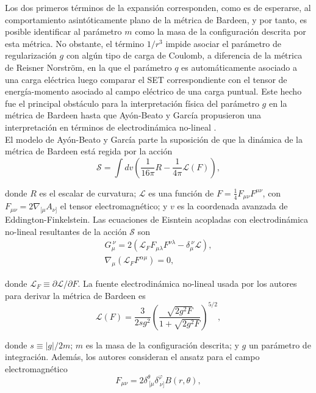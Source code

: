\documentclass[16pt,a4paper]{article}
\numberwithin{equation}{section}
\theoremstyle{definition}
\begin{document}
Los dos primeros términos de la expansión corresponden, como es de esperarse, al comportamiento asintóticamente plano de la métrica de Bardeen, y por tanto, es posible identificar al parámetro $m$ como la masa de la configuración descrita por esta métrica. No obstante, el término $1/r^3$ impide asociar el parámetro  de regularización $g$ con algún tipo de carga de Coulomb, a diferencia de la métrica de Reisner Norström, en la que el parámetro $q$ es automáticamente asociado a una carga eléctrica luego comparar el SET correspondiente con el tensor de energía-momento asociado al campo eléctrico de una carga puntual. Este hecho fue el principal obstáculo para la interpretación física del parámetro $g$ en la métrica de Bardeen hasta que Ayón-Beato y García propusieron una interpretación en términos de electrodinámica no-lineal \cite{ayon-beato2000}.\\

El modelo de Ayón-Beato y García parte la suposición de que la dinámica de la métrica de Bardeen está regida por la acción
\begin{equation}
\mathcal{S} = \int dv \left( \frac{1}{16 \pi}R - \frac{1}{4 \pi}\mathcal{L}(F) \right),
\end{equation}

donde $R$ es el escalar de curvatura; $\mathcal{L}$ es una función de $F = \frac{1}{4}F_{\mu \nu}F^{\mu \nu}$, con $F_{\mu \nu} = 2\nabla_{[\mu}A_{\nu]}$ el tensor electromagnético; y $v$ es la coordenada avanzada de Eddington-Finkelstein. Las ecuaciones de Eisntein acopladas con electrodinámica no-lineal resultantes de la acción $\mathcal{S}$ son
\begin{equation}
\label{euler lagrange eqns}
\begin{aligned}
G_{\mu}^{\ \nu} = 2(\mathcal{L}_{F} F_{\mu \lambda} F^{\nu \lambda} - \delta_{\mu}^{\ \nu} \mathcal{L}),\\
\nabla_{\mu}(\mathcal{L}_{F} F^{\alpha \mu}) = 0,
\end{aligned}
\end{equation}

donde $\mathcal{L}_{F} \equiv \partial \mathcal{L}/\partial F$. La fuente electrodinámica no-lineal usada por los autores para derivar la métrica de Bardeen es 
\begin{equation}
\label{nonlinear bardeen}
\mathcal{L}(F) = \frac{3}{2sg^2}\left( \frac{\sqrt{2g^2F}}{1 + \sqrt{2g^2F}} \right)^{5/2},
\end{equation}

donde $s \equiv |g|/2m$; $m$ es la masa de la configuración descrita; y $g$ un parámetro de integración. Además, los autores consideran el ansatz para el campo electromagnético 
\begin{equation}
F_{\mu \nu} = 2 \delta^{\theta}_{\ \lbrack\mu} \delta^{\varphi}_{\ \nu\rbrack} B(r, \theta),
\end{equation}
\end{document}
